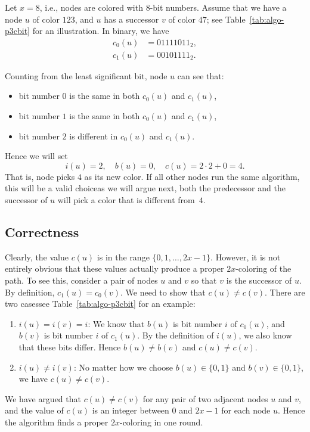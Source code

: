Let $x = 8$, i.e., nodes are colored with $8$-bit numbers. Assume that we have a node $u$ of color $123$, and $u$ has a successor $v$ of color $47$; see Table~\ref{tab:algo-p3cbit} for an illustration. In binary, we have
\begin{align*}
    c_0(u) &= 01111011_2, \\
    c_1(u) &= 00101111_2.
\end{align*}
\begin{samepage}
Counting from the least significant bit, node $u$ can see that:
\begin{itemize}[noitemsep]
    \item bit number $0$ is the same in both $c_0(u)$ and $c_1(u)$,
    \item bit number $1$ is the same in both $c_0(u)$ and $c_1(u)$,
    \item bit number $2$ is different in $c_0(u)$ and $c_1(u)$.
\end{itemize}
\end{samepage}
Hence we will set
\[
    i(u) = 2, \quad
    b(u) = 0, \quad
    c(u) = 2\cdot2 + 0 = 4.
\]
That is, node picks $4$ as its new color. If all other nodes run the same algorithm, this will be a valid choice\mydash as we will argue next, both the predecessor and the successor of $u$ will pick a color that is different from~$4$.


\subsection{Correctness}

Clearly, the value $c(u)$ is in the range $\{0,1,\dotsc,2x-1\}$. However, it is not entirely obvious that these values actually produce a proper $2x$-coloring of the path. To see this, consider a pair of nodes $u$ and $v$ so that $v$ is the successor of $u$. By definition, $c_1(u) = c_0(v)$. We need to show that $c(u) \ne c(v)$. There are two cases\mydash see Table~\ref{tab:algo-p3cbit} for an example:
\begin{enumerate}
    \item $i(u) = i(v) = i$: We know that $b(u)$ is bit number $i$ of $c_0(u)$, and $b(v)$ is bit number $i$ of $c_1(u)$. By the definition of $i(u)$, we also know that these bits differ. Hence $b(u) \ne b(v)$ and $c(u) \ne c(v)$.
    \item $i(u) \ne i(v)$: No matter how we choose $b(u) \in \{0,1\}$ and $b(v) \in \{0,1\}$, we have $c(u) \ne c(v)$.
\end{enumerate}
We have argued that $c(u) \ne c(v)$ for any pair of two adjacent nodes $u$ and $v$, and the value of $c(u)$ is an integer between $0$ and $2x-1$ for each node $u$. Hence the algorithm finds a proper $2x$-coloring in one round.


